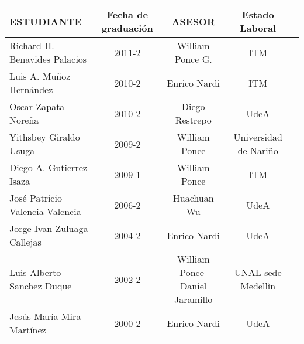 \documentclass[convert={size=800x600}]{standalone}
\begin{document}
\begin{tabular}{|l|c|c|c|c|}
\hline
                      ESTUDIANTE & Fecha de graduación &                           ASESOR &         Estado Laboral \\
\hline
   Richard H. Benavides Palacios &              2011-2 &                 William Ponce G. &                    ITM \\
         Luis A. Muñoz Hernández &              2010-2 &                     Enrico Nardi &                    ITM \\
             Oscar Zapata Noreña &              2010-2 &                   Diego Restrepo &                   UdeA \\
          Yithsbey Giraldo Usuga &              2009-2 &                    William Ponce &  Universidad de Nariño \\
        Diego A. Gutierrez Isaza &              2009-1 &                    William Ponce &                    ITM \\
 José Patricio Valencia Valencia &              2006-2 &                      Huachuan Wu &                   UdeA \\
     Jorge Ivan Zuluaga Callejas &              2004-2 &                     Enrico Nardi &                   UdeA \\
      Luis Alberto Sanchez Duque &              2002-2 &  William Ponce- Daniel Jaramillo &     UNAL sede Medellìn \\
       Jesús María Mira Martínez &              2000-2 &                     Enrico Nardi &                   UdeA \\
\hline
\end{tabular}
\end{document}
